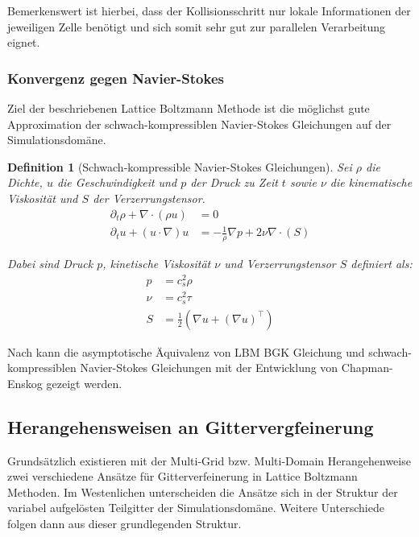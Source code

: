 \documentclass[12pt,a4paper]{scrartcl}
\newtheorem{Definition}[Satz]{Definition}
\numberwithin{equation}{section}
\begin{document}
Bemerkenswert ist hierbei, dass der Kollisionsschritt nur lokale Informationen der jeweiligen Zelle benötigt und sich somit sehr gut zur parallelen Verarbeitung eignet.

\subsubsection{Konvergenz gegen Navier-Stokes}

Ziel der beschriebenen Lattice Boltzmann Methode ist die möglichst gute Approximation der schwach-kompressiblen Navier-Stokes Gleichungen auf der Simulationsdomäne.

\begin{Definition}[Schwach-kompressible Navier-Stokes Gleichungen]
Sei \(\rho\) die Dichte, \(u\) die Geschwindigkeit und \(p\) der Druck zu Zeit \(t\) sowie \(\nu\) die kinematische Viskosität und \(S\) der Verzerrungstensor.
\begin{align*}
\partial_t  \rho + \nabla \cdot (\rho u) &= 0 \\
\partial_t u + (u \cdot \nabla) u &= -\frac{1}{\rho} \nabla p + 2\nu\nabla \cdot (S)
\end{align*}

Dabei sind Druck \(p\), kinetische Viskosität \(\nu\) und Verzerrungstensor \(S\) definiert als:
\begin{align*}
p &= c_s^2 \rho \\
\nu &= c_s^2 \tau \\
S &= \frac{1}{2} (\nabla u + (\nabla u)^\top)
\end{align*}
\end{Definition}

Nach \cite[Kap.~4.1]{krueger17} kann die asymptotische Äquivalenz von LBM BGK Gleichung und schwach-kompressiblen Navier-Stokes Gleichungen mit der Entwicklung von Chapman-Enskog gezeigt werden.

\newpage
\subsection{Herangehensweisen an Gittervergfeinerung}

Grundsätzlich existieren mit der Multi-Grid bzw. Multi-Domain Herangehenweise zwei verschiedene Ansätze für Gitterverfeinerung in Lattice Boltzmann Methoden. Im Westenlichen unterscheiden die Ansätze sich in der Struktur der variabel aufgelösten Teilgitter der Simulationsdomäne. Weitere Unterschiede folgen dann aus dieser grundlegenden Struktur.
\end{document}
